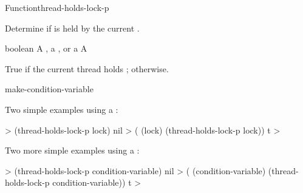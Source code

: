 \documentclass[10pt,twoside,english,pdftex]{article}
\begin{document}

\begin{functiondoc}{Function}{thread-holds-lock-p}{
    }
%

\fnsyntax

\fnpurpose Determine if  is held by the current .

\fnpackage {}

\fnmodule {}

\fnargs
\begin{args}{boolean}
\arg[lock] A , a , or a 
\arg[boolean] A 
\end{args}

\fnreturns True if the current thread holds ; \nil{} otherwise.

\begin{alsos}{make-condition-variable}
\end{alsos}

%
\fnexamples
Two simple examples using a :
%
\W\supp
\begin{example}
  > (thread-holds-lock-p lock)
  nil
  > ( (lock)
      (thread-holds-lock-p lock))
  t
  >
\end{example}
%
Two more simple examples using a :
%
\W\supp\notpretop
\begin{example}
  > (thread-holds-lock-p condition-variable)
  nil
  > ( (condition-variable)
      (thread-holds-lock-p condition-variable))
  t
  >
\end{example}

\end{functiondoc}

\end{document}
